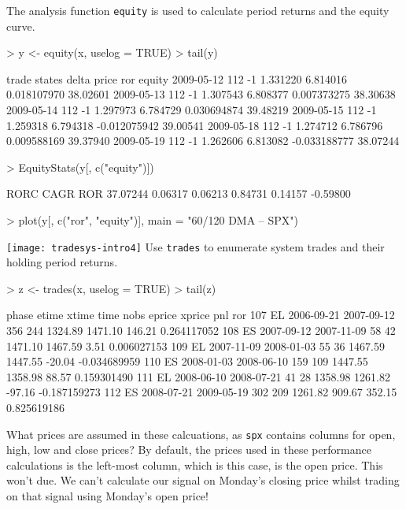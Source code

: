 \documentclass[a4]{article}
\newcommand{\code}[1]{\texttt{#1}}
\begin{document}
The analysis function \code{equity} is used to calculate period
returns and the equity curve.
\begin{Schunk}
\begin{Sinput}
> y <- equity(x, uselog = TRUE)
> tail(y)
\end{Sinput}
\begin{Soutput}
           trade states    delta    price          ror   equity
2009-05-12   112     -1 1.331220 6.814016  0.018107970 38.02601
2009-05-13   112     -1 1.307543 6.808377  0.007373275 38.30638
2009-05-14   112     -1 1.297973 6.784729  0.030694874 39.48219
2009-05-15   112     -1 1.259318 6.794318 -0.012075942 39.00541
2009-05-18   112     -1 1.274712 6.786796  0.009588169 39.37940
2009-05-19   112     -1 1.262606 6.813082 -0.033188777 38.07244
\end{Soutput}
\begin{Sinput}
> EquityStats(y[, c("equity")])
\end{Sinput}
\begin{Soutput}
    RORC     CAGR     ROR%       R2     VOLA    MAXDD 
37.07244  0.06317  0.06213  0.84731  0.14157 -0.59800 
\end{Soutput}
\begin{Sinput}
> plot(y[, c("ror", "equity")], main = "60/120 DMA -- SPX")
\end{Sinput}
\end{Schunk}
\texttt{[image: tradesys-intro4]}
Use \code{trades} to enumerate system trades and their holding
period returns.
\begin{Schunk}
\begin{Sinput}
> z <- trades(x, uselog = TRUE)
> tail(z)
\end{Sinput}
\begin{Soutput}
    phase      etime      xtime time nobs  eprice  xprice    pnl          ror
107    EL 2006-09-21 2007-09-12  356  244 1324.89 1471.10 146.21  0.264117052
108    ES 2007-09-12 2007-11-09   58   42 1471.10 1467.59   3.51  0.006027153
109    EL 2007-11-09 2008-01-03   55   36 1467.59 1447.55 -20.04 -0.034689959
110    ES 2008-01-03 2008-06-10  159  109 1447.55 1358.98  88.57  0.159301490
111    EL 2008-06-10 2008-07-21   41   28 1358.98 1261.82 -97.16 -0.187159273
112    ES 2008-07-21 2009-05-19  302  209 1261.82  909.67 352.15  0.825619186
\end{Soutput}
\end{Schunk}
What prices are assumed in these calcuations, as \code{spx} contains
columns for open, high, low and close prices? By default, the prices
used in these performance calculations is the left-most column, which
is this case, is the open price. This won't due. We can't calculate
our signal on Monday's closing price whilst trading on that signal
using Monday's open price! 
\end{document}
